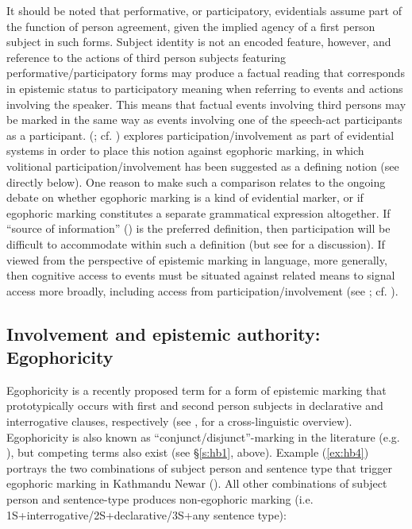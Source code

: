 \documentclass[output=paper]{langsci/langscibook}
\begin{document}
It should be noted that performative, or participatory, evidentials assume part of the function of person agreement, given the implied agency of a first person subject in such forms. Subject identity is not an encoded feature, however, and reference to the actions of third person subjects featuring performative/participatory forms may produce a factual reading that corresponds in epistemic status to participatory meaning when referring to events and actions involving the speaker. This means that factual events involving third persons may be marked in the same way as events involving one of the speech-act participants as a participant. \citeauthor{BergqvistKittila2017} (\citeyear{BergqvistKittila2017}; cf. \citealt{Bergqvist2015}) explores participation/involvement as part of evidential systems in order to place this notion against egophoric marking, in which volitional participation/involvement has been suggested as a defining notion (see directly below). One reason to make such a comparison relates to the ongoing debate on whether egophoric marking is a kind of evidential marker, or if egophoric marking constitutes a separate grammatical expression altogether. If “source of information” (\citealt{Aikhenvald2004}) is the preferred definition, then participation will be difficult to accommodate within such a definition (but see \citealt{SanRoqueLoughnane2012} for a discussion). If viewed from the perspective of epistemic marking in language, more generally, then cognitive access to events must be situated against related means to signal access more broadly, including access from participation/involvement (see \citealt{Bergqvist2017}; cf. \citealt{Boye2012}).  
%
\subsection{Involvement and epistemic authority: Egophoricity}\label{s:hb3-2}

Egophoricity is a recently proposed term for a form of epistemic marking that prototypically occurs with first and second person subjects in declarative and interrogative clauses, respectively (see \citealt{SanRoqueetal2018}, for a cross-linguistic overview). Egophoricity is also known as “conjunct/disjunct”-marking in the literature (e.g. \citealt{BickelNichols2007}), but competing terms also exist (see §\ref{s:hb1}, above). Example (\ref{ex:hb4}) portrays the two combinations of subject person and sentence type that trigger egophoric marking in Kathmandu Newar (\citealt{Hale1980}). All other combinations of subject person and sentence-type produces non-egophoric marking (i.e. 1S+interrogative/2S+declarative/3S+any sentence type):
\end{document}
